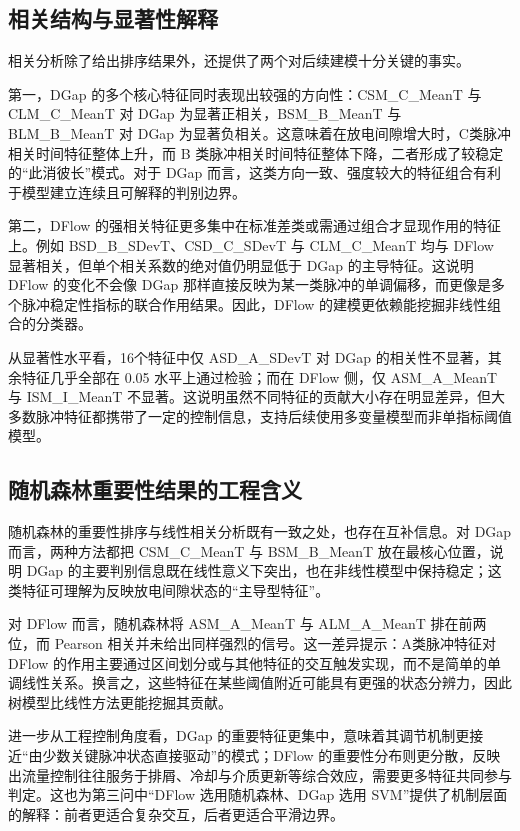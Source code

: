 \documentclass[UTF8,a4paper,12pt]{ctexart}
\begin{document}
\subsection{相关结构与显著性解释}

相关分析除了给出排序结果外，还提供了两个对后续建模十分关键的事实。

第一，DGap 的多个核心特征同时表现出较强的方向性：CSM\_C\_MeanT 与 CLM\_C\_MeanT 对 DGap 为显著正相关，BSM\_B\_MeanT 与 BLM\_B\_MeanT 对 DGap 为显著负相关。这意味着在放电间隙增大时，C类脉冲相关时间特征整体上升，而 B 类脉冲相关时间特征整体下降，二者形成了较稳定的“此消彼长”模式。对于 DGap 而言，这类方向一致、强度较大的特征组合有利于模型建立连续且可解释的判别边界。

第二，DFlow 的强相关特征更多集中在标准差类或需通过组合才显现作用的特征上。例如 BSD\_B\_SDevT、CSD\_C\_SDevT 与 CLM\_C\_MeanT 均与 DFlow 显著相关，但单个相关系数的绝对值仍明显低于 DGap 的主导特征。这说明 DFlow 的变化不会像 DGap 那样直接反映为某一类脉冲的单调偏移，而更像是多个脉冲稳定性指标的联合作用结果。因此，DFlow 的建模更依赖能挖掘非线性组合的分类器。

从显著性水平看，16个特征中仅 ASD\_A\_SDevT 对 DGap 的相关性不显著，其余特征几乎全部在 0.05 水平上通过检验；而在 DFlow 侧，仅 ASM\_A\_MeanT 与 ISM\_I\_MeanT 不显著。这说明虽然不同特征的贡献大小存在明显差异，但大多数脉冲特征都携带了一定的控制信息，支持后续使用多变量模型而非单指标阈值模型。

\subsection{随机森林重要性结果的工程含义}

随机森林的重要性排序与线性相关分析既有一致之处，也存在互补信息。对 DGap 而言，两种方法都把 CSM\_C\_MeanT 与 BSM\_B\_MeanT 放在最核心位置，说明 DGap 的主要判别信息既在线性意义下突出，也在非线性模型中保持稳定；这类特征可理解为反映放电间隙状态的“主导型特征”。

对 DFlow 而言，随机森林将 ASM\_A\_MeanT 与 ALM\_A\_MeanT 排在前两位，而 Pearson 相关并未给出同样强烈的信号。这一差异提示：A类脉冲特征对 DFlow 的作用主要通过区间划分或与其他特征的交互触发实现，而不是简单的单调线性关系。换言之，这些特征在某些阈值附近可能具有更强的状态分辨力，因此树模型比线性方法更能挖掘其贡献。

进一步从工程控制角度看，DGap 的重要特征更集中，意味着其调节机制更接近“由少数关键脉冲状态直接驱动”的模式；DFlow 的重要性分布则更分散，反映出流量控制往往服务于排屑、冷却与介质更新等综合效应，需要更多特征共同参与判定。这也为第三问中“DFlow 选用随机森林、DGap 选用 SVM”提供了机制层面的解释：前者更适合复杂交互，后者更适合平滑边界。
\end{document}
